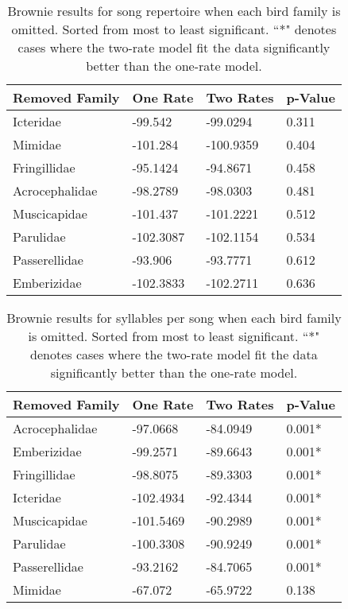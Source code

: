 \documentclass[a4paper,12pt]{article}
\begin{document}
\begin{table}[ht]
\caption{Brownie results for song repertoire when each bird family is omitted.  Sorted from most to least significant.  ``*" denotes cases where the two-rate model fit the data significantly better than the one-rate model.}
\centering
\begin{tabular}{llll}
  \hline
Removed Family & One Rate & Two Rates & p-Value \\ 
  \hline
Icteridae & -99.542 & -99.0294 & 0.311 \\ 
  Mimidae & -101.284 & -100.9359 & 0.404 \\ 
  Fringillidae & -95.1424 & -94.8671 & 0.458 \\ 
  Acrocephalidae & -98.2789 & -98.0303 & 0.481 \\ 
  Muscicapidae & -101.437 & -101.2221 & 0.512 \\ 
  Parulidae & -102.3087 & -102.1154 & 0.534 \\ 
  Passerellidae & -93.906 & -93.7771 & 0.612 \\ 
  Emberizidae & -102.3833 & -102.2711 & 0.636 \\ 
   \hline
\end{tabular}
\end{table}

\begin{table}[ht]
\caption{Brownie results for syllables per song when each bird family is omitted.  Sorted from most to least significant.  ``*" denotes cases where the two-rate model fit the data significantly better than the one-rate model.}
\centering
\begin{tabular}{llll}
  \hline
Removed Family & One Rate & Two Rates & p-Value \\ 
  \hline
Acrocephalidae & -97.0668 & -84.0949 & 0.001* \\ 
  Emberizidae & -99.2571 & -89.6643 & 0.001* \\ 
  Fringillidae & -98.8075 & -89.3303 & 0.001* \\ 
  Icteridae & -102.4934 & -92.4344 & 0.001* \\ 
  Muscicapidae & -101.5469 & -90.2989 & 0.001* \\ 
  Parulidae & -100.3308 & -90.9249 & 0.001* \\ 
  Passerellidae & -93.2162 & -84.7065 & 0.001* \\ 
  Mimidae & -67.072 & -65.9722 & 0.138 \\ 
   \hline
\end{tabular}
\end{table}
\end{document}
